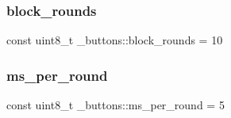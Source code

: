 \subsubsection{\texorpdfstring{block\+\_\+rounds}{block\_rounds}}
{\footnotesize\ttfamily const uint8\+\_\+t \+\_\+buttons\+::block\+\_\+rounds = 10\hspace{0.3cm}{\ttfamily [static]}}

\hypertarget{namespace__buttons_aef8eb0435c3dc3b3515745107a52ab68}{}\label{namespace__buttons_aef8eb0435c3dc3b3515745107a52ab68} 
\subsubsection{\texorpdfstring{ms\+\_\+per\+\_\+round}{ms\_per\_round}}
{\footnotesize\ttfamily const uint8\+\_\+t \+\_\+buttons\+::ms\+\_\+per\+\_\+round = 5\hspace{0.3cm}{\ttfamily [static]}}


